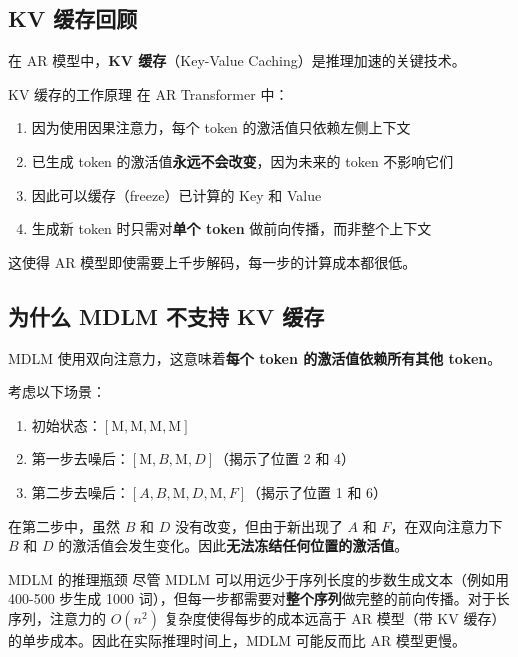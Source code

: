 \documentclass[a4paper]{article}
\begin{document}
\subsection{KV 缓存回顾}

在 AR 模型中，\textbf{KV 缓存}（Key-Value Caching）是推理加速的关键技术。

\begin{knowledgebox}{KV 缓存的工作原理}
在 AR Transformer 中：
\begin{enumerate}
    \item 因为使用因果注意力，每个 token 的激活值只依赖左侧上下文
    \item 已生成 token 的激活值\textbf{永远不会改变}，因为未来的 token 不影响它们
    \item 因此可以缓存（freeze）已计算的 Key 和 Value
    \item 生成新 token 时只需对\textbf{单个 token} 做前向传播，而非整个上下文
\end{enumerate}
这使得 AR 模型即使需要上千步解码，每一步的计算成本都很低。
\end{knowledgebox}

\subsection{为什么 MDLM 不支持 KV 缓存}

MDLM 使用双向注意力，这意味着\textbf{每个 token 的激活值依赖所有其他 token}。

考虑以下场景：
\begin{enumerate}
    \item 初始状态：$[\text{M}, \text{M}, \text{M}, \text{M}]$
    \item 第一步去噪后：$[\text{M}, B, \text{M}, D]$（揭示了位置 2 和 4）
    \item 第二步去噪后：$[A, B, \text{M}, D, \text{M}, F]$（揭示了位置 1 和 6）
\end{enumerate}

在第二步中，虽然 $B$ 和 $D$ 没有改变，但由于新出现了 $A$ 和 $F$，在双向注意力下 $B$ 和 $D$ 的激活值会发生变化。因此\textbf{无法冻结任何位置的激活值}。

\begin{warningbox}{MDLM 的推理瓶颈}
尽管 MDLM 可以用远少于序列长度的步数生成文本（例如用 400-500 步生成 1000 词），但每一步都需要对\textbf{整个序列}做完整的前向传播。对于长序列，注意力的 $O(n^2)$ 复杂度使得每步的成本远高于 AR 模型（带 KV 缓存）的单步成本。因此在实际推理时间上，MDLM 可能反而比 AR 模型更慢。
\end{warningbox}
\end{document}

